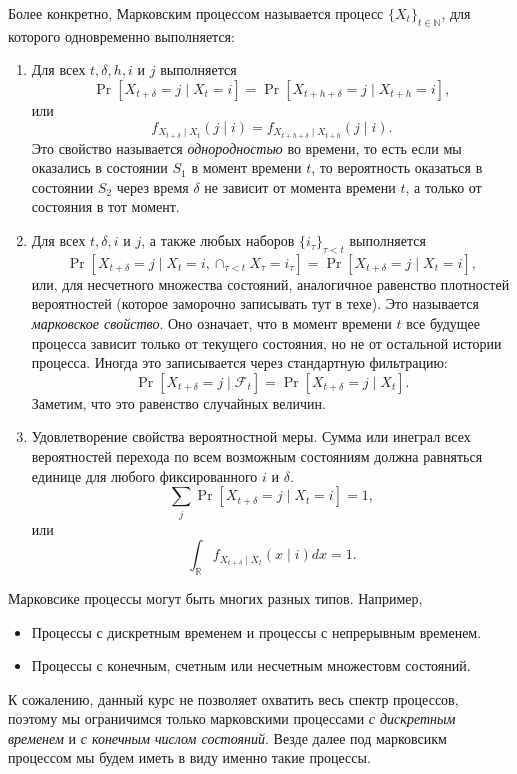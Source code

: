 \documentclass[12pt]{article}
\newcommand\N{\mathbb{N}}
\newcommand\R{\mathbb{R}}
\newcommand\F{\mathcal{F}}
\begin{document}
Более конкретно, Марковским процессом называется процесс $\{X_t\}_{t \in \N}$, для которого одновременно выполняется:
\begin{enumerate}
  \item Для всех $t, \delta, h, i$ и $j$ выполняется \[\Pr[X_{t + \delta} = j \mid X_t = i] = \Pr[X_{t + h + \delta} = j \mid X_{t + h} = i],\] или \[f_{X_{t + \delta} \mid X_t}(j \mid i) = f_{X_{t + h + \delta} \mid X_{t + h}}(j \mid i).\] 
  Это свойство называется \emph{однородностью} во времени, то есть если мы оказались в состоянии $S_1$ в момент времени $t$, то вероятность оказаться в состоянии $S_2$ через время $\delta$ не зависит от момента времени $t$, а только от состояния в тот момент.
  \item Для всех $t, \delta, i$ и $j$, а также любых наборов $\{i_\tau\}_{\tau < t}$ выполняется \[\Pr[X_{t + \delta} = j \mid X_t = i, \cap_{\tau < t} X_\tau = i_\tau] = \Pr[X_{t + \delta} = j \mid X_t = i], \] или, для несчетного множества состояний, аналогичное равенство плотностей вероятностей (которое заморочно записывать тут в техе).
  Это называется \emph{марковское свойство}. Оно означает, что в момент времени $t$ все будущее процесса зависит только от текущего состояния, но не от остальной истории процесса. Иногда это записывается через стандартную фильтрацию:
  \[\Pr[X_{t + \delta} = j \mid \F_t] = \Pr[X_{t + \delta} = j \mid X_t]. \]
  Заметим, что это равенство случайных величин.
  \item Удовлетворение свойства вероятностной меры. Сумма или инеграл всех вероятностей перехода по всем возможным состояниям должна равняться единице для любого фиксированного $i$ и $\delta$.
  \[ \sum_j \Pr[X_{t + \delta} = j \mid X_t = i] = 1,\]
  или
  \[ \int_\R f_{X_{t + \delta} \mid X_t}(x \mid i) dx = 1. \]
\end{enumerate}

Марковсике процессы могут быть многих разных типов. Например,
\begin{itemize}
  \item Процессы с дискретным временем и процессы с непрерывным временем.
  \item Процессы с конечным, счетным или несчетным множестовм состояний.
\end{itemize}

К сожалению, данный курс не позволяет охватить весь спектр процессов, поэтому мы ограничимся только марковскими процессами \emph{с дискретным временем} и \emph{с конечным числом состояний}. Везде далее под марковсикм процессом мы будем иметь в виду именно такие процессы.
\end{document}
